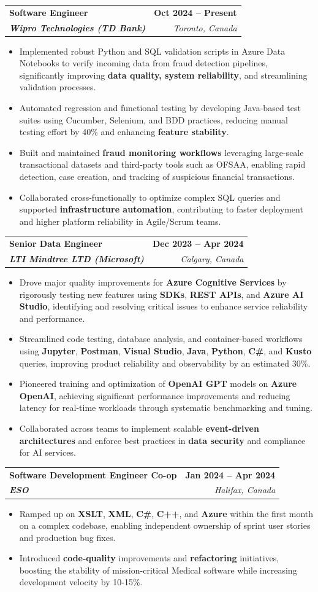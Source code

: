 \documentclass[letterpaper,11pt]{article}
\makeatletter
\newcommand{\resumeItem}[1]{
  \item\small{
    {#1 \vspace{-2pt}}
  }
}
\newcommand{\resumeSubheading}[4]{
  \vspace{-2pt}\item
    \begin{tabular*}{1.0\textwidth}[t]{l@{\extracolsep{\fill}}r}
      \textbf{#1} & \textbf{\small #2} \\
      \textit{\small#3} & \textit{\small #4} \\
    \end{tabular*}\vspace{-7pt}
}
\newcommand{\resumeItemListStart}{\begin{itemize}}
\newcommand{\resumeItemListEnd}{\end{itemize}\vspace{-5pt}}
\makeatother
\begin{document}
    \resumeSubheading
      {\textbf{Software Engineer}}{\textbf{Oct 2024 -- Present}}
      {\textbf{Wipro Technologies (TD Bank)}}{Toronto, Canada}
      \resumeItemListStart
        \resumeItem{Implemented robust Python and SQL validation scripts in Azure Data Notebooks to verify incoming data from fraud detection pipelines, significantly improving \textbf{data quality, system reliability}, and streamlining validation processes.}
        \resumeItem{Automated regression and functional testing by developing Java-based test suites using Cucumber, Selenium, and BDD practices, reducing manual testing effort by 40\% and enhancing \textbf{feature stability}.}
        \resumeItem{Built and maintained \textbf{fraud monitoring workflows} leveraging large-scale transactional datasets and third-party tools such as OFSAA, enabling rapid detection, case creation, and tracking of suspicious financial transactions.}
        \resumeItem{Collaborated cross-functionally to optimize complex SQL queries and supported \textbf{infrastructure automation}, contributing to faster deployment and higher platform reliability in Agile/Scrum teams.}
      \resumeItemListEnd

    \resumeSubheading
      {\textbf{Senior Data Engineer}}{\textbf{Dec 2023 -- Apr 2024}}
      {\textbf{LTI Mindtree LTD (Microsoft)}}{Calgary, Canada}
      \resumeItemListStart
        \resumeItem{Drove major quality improvements for \textbf{Azure Cognitive Services} by rigorously testing new features using \textbf{SDKs}, \textbf{REST APIs}, and \textbf{Azure AI Studio}, identifying and resolving critical issues to enhance service reliability and performance.}
        \resumeItem{Streamlined code testing, database analysis, and container-based workflows using \textbf{Jupyter}, \textbf{Postman}, \textbf{Visual Studio}, \textbf{Java}, \textbf{Python}, \textbf{C\#}, and \textbf{Kusto} queries, improving product reliability and observability by an estimated 30\%.}
        \resumeItem{Pioneered training and optimization of \textbf{OpenAI GPT} models on \textbf{Azure OpenAI}, achieving significant performance improvements and reducing latency for real-time workloads through systematic benchmarking and tuning.}
        \resumeItem{Collaborated across teams to implement scalable \textbf{event-driven architectures} and enforce best practices in \textbf{data security} and compliance for AI services.}
      \resumeItemListEnd
    
    \resumeSubheading
      {\textbf{Software Development Engineer Co-op}}{\textbf{Jan 2024 -- Apr 2024}}
      {\textbf{ESO}}{Halifax, Canada}
      \resumeItemListStart
        \resumeItem{Ramped up on \textbf{XSLT}, \textbf{XML}, \textbf{C\#}, \textbf{C++}, and \textbf{Azure} within the first month on a complex codebase, enabling independent ownership of sprint user stories and production bug fixes.}
        \resumeItem{Introduced \textbf{code-quality} improvements and \textbf{refactoring} initiatives, boosting the stability of mission-critical Medical software while increasing development velocity by 10-15\%.}
      \resumeItemListEnd
\end{document}
